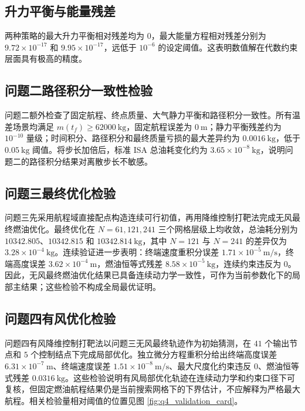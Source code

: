 \documentclass[withoutpreface,bwprint]{cumcmthesis}
\begin{document}
\subsection{升力平衡与能量残差}

两种策略的最大升力平衡相对残差均为 $0$，最大能量方程相对残差分别为 $9.72\times 10^{-17}$ 和 $9.95\times 10^{-17}$，远低于 $10^{-6}$ 的设定阈值。这表明数值解在代数约束层面具有极高的精度。

\subsection{问题二路径积分一致性检验}

问题二额外检查了固定航程、终点质量、大气静力平衡和路径积分一致性。所有温差场景均满足 $m(t_f)\geq62000\ \mathrm{kg}$，固定航程误差为 $0\ \mathrm{m}$；静力平衡残差约为 $10^{-10}$ 量级；时间积分、路径积分和最终质量亏损的最大差异约为 $0.0016\ \mathrm{kg}$，低于 $0.05\ \mathrm{kg}$ 阈值。将步长加倍后，标准 ISA 总油耗变化约为 $3.65\times10^{-8}\ \mathrm{kg}$，说明问题二的路径积分结果对离散步长不敏感。

\subsection{问题三最终优化检验}

问题三先采用航程域直接配点构造连续可行初值，再用降维控制打靶法完成无风最终燃油优化。最终优化在 $N=61,121,241$ 三个网格层级上均收敛，总油耗分别为 $10342.805$、$10342.815$ 和 $10342.814\ \mathrm{kg}$，其中 $N=121$ 与 $N=241$ 的差异仅为 $3.28\times10^{-4}\ \mathrm{kg}$。连续验证进一步表明：终端速度重积分误差 $1.71\times10^{-5}\ \mathrm{m/s}$，终端高度误差 $3.62\times10^{-4}\ \mathrm{m}$，燃油恒等式残差 $8.58\times10^{-5}\ \mathrm{kg}$，连续约束违反为 $0$。因此，无风最终燃油优化结果已具备连续动力学一致性，可作为当前参数化下的局部主结果；这些检验不构成全局最优证明。

\subsection{问题四有风优化检验}

问题四有风降维控制打靶法以问题三无风最终轨迹作为初始猜测，在 $41$ 个输出节点和 $5$ 个控制结点下完成局部优化。独立微分方程重积分给出终端高度误差 $6.31\times10^{-7}\ \mathrm{m}$、终端速度误差 $1.51\times10^{-8}\ \mathrm{m/s}$、最大尺度化约束违反 $0$、燃油恒等式残差 $0.0316\ \mathrm{kg}$。这些检验说明有风局部优化轨迹在连续动力学和约束口径下可复核，但固定燃油航程结果仍是当前搜索网格下的下界估计，不应解释为严格最大航程。相关检验量相对阈值的位置见图 \ref{fig:q4_validation_card}。
\end{document}
